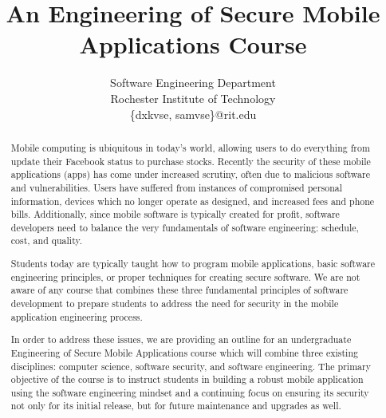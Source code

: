 \documentclass[conference]{IEEEtran}
\begin{document}
\title{An Engineering of Secure Mobile Applications Course}

\author{
Software Engineering Department\\
Rochester Institute of Technology\\
\{dxkvse, samvse\}@rit.edu

}



\maketitle
\begin{abstract}
Mobile computing is ubiquitous in today's world, allowing users to do everything from update their Facebook status to purchase stocks. Recently the security of these mobile applications (apps) has come under increased scrutiny, often due to malicious software and vulnerabilities. Users have suffered from instances of compromised personal information, devices which no longer operate as designed, and increased fees and phone bills. Additionally, since mobile software is typically created for profit, software developers need to balance the very fundamentals of software engineering: schedule, cost, and quality.

Students today are typically taught how to program mobile applications, basic software engineering principles, or proper techniques for creating secure software. We are not aware of any course that combines these three fundamental principles of software development to prepare students to address the need for security in the mobile application engineering process.

In order to address these issues, we are providing an outline for an undergraduate Engineering of Secure Mobile Applications course which will combine three existing disciplines: computer science, software security, and software engineering. The primary objective of the course is to instruct students in building a robust mobile application using the software engineering mindset and a continuing focus on ensuring its security not only for its initial release, but for future maintenance and upgrades as well.




\end{abstract}
\end{document}
